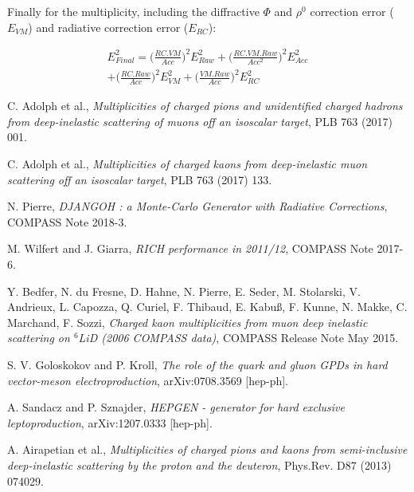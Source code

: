 \documentclass[letterpaper,12pt]{article}
\begin{document}
Finally for the multiplicity, including the diffractive $\Phi$ and $\rho^0$ correction error ($E_{VM}$) and radiative correction error ($E_{RC}$):

\begin{equation}
\begin{split}
		E^2_{Final} = \bigg( \frac{RC.VM}{Acc} \bigg)^2 E^2_{Raw} + \bigg(\frac{RC.VM.Raw}{Acc^2} \bigg)^2 E^2_{Acc} \\
		+ \bigg(\frac{RC.Raw}{Acc} \bigg)^2 E^2_{VM} + \bigg(\frac{VM.Raw}{Acc} \bigg)^2 E^2_{RC}
\end{split}
\end{equation}


\newpage

\begin{thebibliography}{99}

C. Adolph et al., \textit{Multiplicities of charged pions and unidentified charged hadrons from deep-inelastic scattering of muons off an isoscalar target}, PLB 763 (2017) 001.

C. Adolph et al., \textit{Multiplicities of charged kaons from deep-inelastic muon scattering off an isoscalar target}, PLB 763 (2017) 133.

N. Pierre, \textit{DJANGOH : a Monte-Carlo Generator with Radiative Corrections}, COMPASS Note 2018-3.

M. Wilfert and J. Giarra, \textit{RICH performance in 2011/12}, COMPASS Note 2017-6.

Y. Bedfer, N. du Fresne, D. Hahne, N. Pierre, E. Seder, M. Stolarski, V. Andrieux, L. Capozza, Q. Curiel, F. Thibaud, E. Kabu{\ss}, F. Kunne, N. Makke, C. Marchand, F. Sozzi, \textit{Charged kaon multiplicities from muon deep inelastic scattering on $^6$LiD (2006 COMPASS data)}, COMPASS Release Note May 2015.

S. V. Goloskokov and P. Kroll, \textit{The role of the quark and gluon GPDs in hard vector-meson electroproduction}, arXiv:0708.3569 [hep-ph].

A. Sandacz and P. Sznajder, \textit{HEPGEN - generator for hard exclusive leptoproduction}, arXiv:1207.0333 [hep-ph].

A. Airapetian et al., \textit{Multiplicities of charged pions and kaons from semi-inclusive deep-inelastic scattering by the proton and the deuteron}, Phys.Rev. D87 (2013) 074029.

\end{thebibliography}
\end{document}
